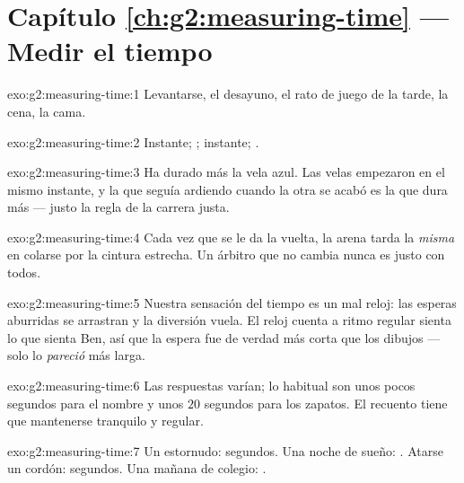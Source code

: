 \section*{Capítulo \ref{ch:g2:measuring-time} --- Medir el tiempo}

\begin{solution}{exo:g2:measuring-time:1}
Levantarse, el desayuno, el rato de juego de la tarde, la cena, la
cama.
\end{solution}

\begin{solution}{exo:g2:measuring-time:2}
Instante; ; instante; .
\end{solution}

\begin{solution}{exo:g2:measuring-time:3}
Ha durado más la vela azul. Las velas empezaron en el mismo instante,
y la que seguía ardiendo cuando la otra se acabó es la que dura más
--- justo la regla de la carrera justa.
\end{solution}

\begin{solution}{exo:g2:measuring-time:4}
Cada vez que se le da la vuelta, la arena tarda la \emph{misma}
 en colarse por la cintura estrecha. Un árbitro que no
cambia nunca es justo con todos.
\end{solution}

\begin{solution}{exo:g2:measuring-time:5}
Nuestra sensación del tiempo es un mal reloj: las esperas aburridas se
arrastran y la diversión vuela. El reloj cuenta a ritmo regular sienta
lo que sienta Ben, así que la espera fue de verdad más corta que los
dibujos --- solo lo \emph{pareció} más larga.
\end{solution}

\begin{solution}{exo:g2:measuring-time:6}
Las respuestas varían; lo habitual son unos pocos segundos para el
nombre y unos $20$ segundos para los zapatos. El recuento tiene que
mantenerse tranquilo y regular.
\end{solution}

\begin{solution}{exo:g2:measuring-time:7}
Un estornudo: segundos. Una noche de sueño: . Atarse un cordón:
segundos. Una mañana de colegio: .
\end{solution}

